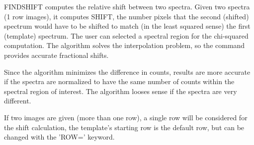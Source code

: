 FINDSHIFT computes the relative shift between two spectra.  Given two
spectra (1 row images), it computes SHIFT, the number pixels that the
second (shifted) spectrum would have to be shifted to match (in the least
squared sense) the first (template) spectrum. The user can selected a
spectral region for the chi-squared computation. The algorithm solves the
interpolation problem, so the command provides accurate fractional shifts.

Since the algorithm minimizes the difference in counts, results are more
accurate if the spectra are normalized to have the same number of counts
within the spectral region of interest. The algorithm looses sense if the
spectra are very different.

If two images are given (more than one row), a single row will be
considered for the shift calculation, the template's starting row is the
default row, but can be changed with the 'ROW=' keyword.

